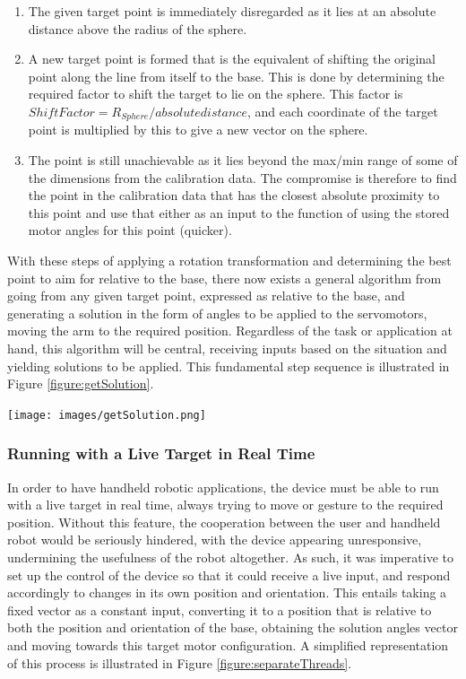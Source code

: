 \documentclass[11pt]{article}
\begin{document}
\begin{enumerate}
\item{The given target point is immediately disregarded as it lies at an absolute distance above the radius of the sphere.}
\item{A new target point is formed that is the equivalent of shifting the original point along the line from itself to the base. This is done by determining the required factor to shift the target to lie on the sphere. This factor is $Shift Factor = R_{Sphere} / absolute distance$, and each coordinate of the target point is multiplied by this to give a new vector on the sphere.}
\item{The point is still unachievable as it lies beyond the max/min range of some of the dimensions from the calibration data. The compromise is therefore to find the point in the calibration data that has the closest absolute proximity to this point and use that either as an input to the function of using the stored motor angles for this point (quicker). }
\end{enumerate}

With these steps of applying a rotation transformation and determining the best point to aim for relative to the base, there now exists a general algorithm from going from any given target point, expressed as relative to the base, and generating a solution in the form of angles to be applied to the servomotors, moving the arm to the required position. Regardless of the task or application at hand, this algorithm will be central, receiving inputs based on the situation and yielding solutions to be applied. This fundamental step sequence is illustrated in Figure \ref{figure:getSolution}.


\begin{center}
\texttt{[image: images/getSolution.png]}
\label{figure:getSolution}
\end{center}

\subsubsection{Running with a Live Target in Real Time}
In order to have handheld robotic applications, the device must be able to run with a live target in real time, always trying to move or gesture to the required position. Without this feature, the cooperation between the user and handheld robot would be seriously hindered, with the device appearing unresponsive, undermining the usefulness of the robot altogether. As such, it was imperative to set up the control of the device so that it could receive a live input, and respond accordingly to changes in its own position and orientation. This entails taking a fixed vector as a constant input, converting it to a position that is relative to both the position and orientation of the base, obtaining the solution angles vector and moving towards this target motor configuration. A simplified representation of this process is illustrated in Figure \ref{figure:separateThreads}.
\end{document}
